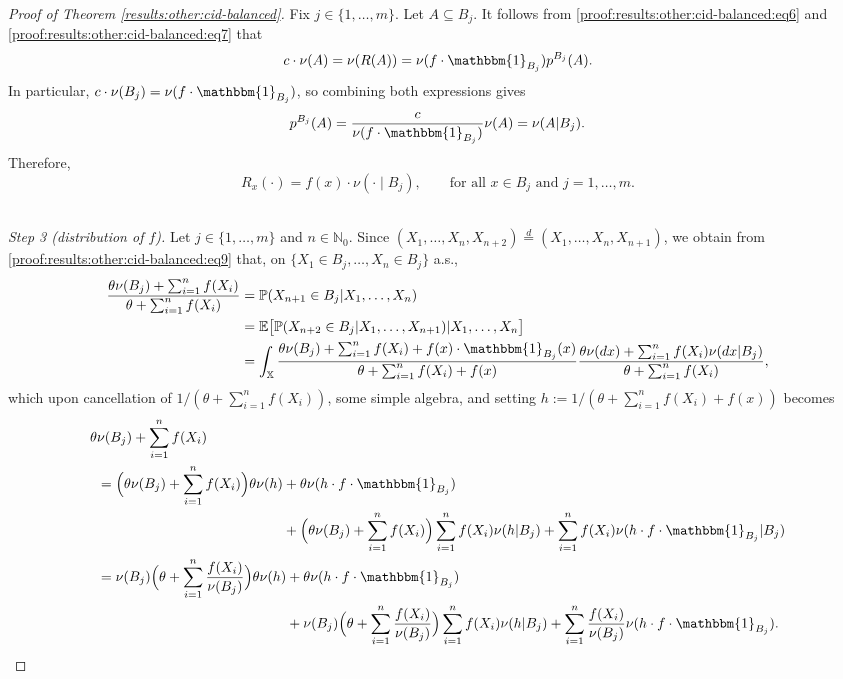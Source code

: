 \documentclass[a4paper]{article}
\theoremstyle{plain}
\theoremstyle{remark}
\theoremstyle{definition}
\begin{document}
\begin{proof}[Proof of Theorem \ref{results:other:cid-balanced}]
Fix $j\in\{1,\ldots,m\}$. Let $A\subseteq B_j$. It follows from \eqref{proof:results:other:cid-balanced:eq6} and \eqref{proof:results:other:cid-balanced:eq7} that
\[c\cdot\nu(A)=\nu(R(A))=\nu(f\cdot\mathbbm{1}_{B_j})p^{B_j}(A).\]
In particular, $c\cdot\nu(B_j)=\nu(f\cdot\mathbbm{1}_{B_j})$, so combining both expressions gives
\[p^{B_j}(A)=\frac{c}{\nu(f\cdot\mathbbm{1}_{B_j})}\nu(A)=\nu(A|B_j).\]
Therefore,
\begin{equation}\label{proof:results:other:cid-balanced:eq9}
R_x(\cdot)=f(x)\cdot\nu(\cdot\mid B_j),\qquad\mbox{for all }x\in B_j\mbox{ and }j=1,\ldots,m.
\end{equation}~

\noindent\textit{Step 3 (distribution of $f$).} Let $j\in\{1,\ldots,m\}$ and $n\in\mathbb{N}_0$. Since $(X_1,\ldots,X_n,X_{n+2})\overset{d}{=}(X_1,\ldots,X_n,X_{n+1})$, we obtain from \eqref{proof:results:other:cid-balanced:eq9} that, on $\{X_1\in B_j,\ldots,X_n\in B_j\}$ a.s.,
\begingroup\allowdisplaybreaks
\begin{align*}
\frac{\theta\nu(B_j)+\sum_{i=1}^nf(X_i)}{\theta+\sum_{i=1}^nf(X_i)}&=\mathbb{P}(X_{n+1}\in B_j|X_1,\ldots,X_n)\\
&=\mathbb{E}\bigl[\mathbb{P}(X_{n+2}\in B_j|X_1,\ldots,X_{n+1})|X_1,\ldots,X_n\bigr]\\
&=\int_\mathbb{X}\frac{\theta\nu(B_j)+\sum_{i=1}^nf(X_i)+f(x)\cdot\mathbbm{1}_{B_j}(x)}{\theta+\sum_{i=1}^nf(X_i)+f(x)}\frac{\theta\nu(dx)+\sum_{i=1}^nf(X_i)\nu(dx|B_j)}{\theta+\sum_{i=1}^nf(X_i)},
\end{align*}
\endgroup
which upon cancellation of $1/(\theta+\sum_{i=1}^nf(X_i))$, some simple algebra, and setting $h:=1/(\theta+\sum_{i=1}^nf(X_i)+f(x))$ becomes
\begingroup\allowdisplaybreaks
\begin{align*}
\theta&\nu(B_j)+\sum_{i=1}^nf(X_i)\\
&\begin{aligned}\;=\Bigl(\theta\nu(B_j)+\sum_{i=1}^nf(X_i)\Bigr)\theta\nu(h)&+\theta\nu(h\cdot f\cdot\mathbbm{1}_{B_j})\\
&+\Bigl(\theta\nu(B_j)+\sum_{i=1}^nf(X_i)\Bigr)\sum_{i=1}^nf(X_i)\nu(h|B_j)+\sum_{i=1}^nf(X_i)\nu(h\cdot f\cdot\mathbbm{1}_{B_j}|B_j)\end{aligned}\\
&\begin{aligned}\;=\nu(B_j)\Bigl(\theta+\sum_{i=1}^n\frac{f(X_i)}{\nu(B_j)}\Bigr)\theta\nu(h)&+\theta\nu(h\cdot f\cdot\mathbbm{1}_{B_j})\\
&+\nu(B_j)\Bigl(\theta+\sum_{i=1}^n\frac{f(X_i)}{\nu(B_j)}\Bigr)\sum_{i=1}^nf(X_i)\nu(h|B_j)+\sum_{i=1}^n\frac{f(X_i)}{\nu(B_j)}\nu(h\cdot f\cdot\mathbbm{1}_{B_j}).\end{aligned}

\end{align*}
\end{proof}
\end{document}
